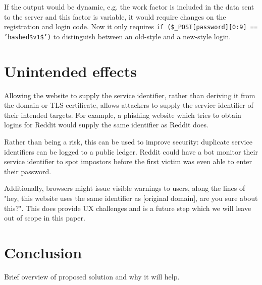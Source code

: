 \documentclass{paper}
\newcommand{\code}[1]{\texttt{\colorbox{gray!11}{#1}}}
\begin{document}
If the output would be dynamic, e.g. the work factor is included in the data sent to the
server and this factor is variable, it would require changes on the registration and login
code. Now it only requires \code{if (\$\_POST[password][0:9] == 'hashed\$v1\$')} to
distinguish between an old-style and a new-style login.

\section{Unintended effects}

Allowing the website to supply the service identifier, rather than deriving it from the
domain or TLS certificate, allows attackers to supply the service identifier of their
intended targets. For example, a phishing website which tries to obtain logins for Reddit
would supply the same identifier as Reddit does.

Rather than being a risk, this can be used to improve security: duplicate service
identifiers can be logged to a public ledger. Reddit could have a bot monitor their service
identifier to spot impostors before the first victim was even able to enter their password.

Additionally, browsers might issue visible warnings to users, along the lines of "hey, this
website uses the same identifier as [original domain], are you sure about this?". This does
provide UX challenges and is a future step which we will leave out of scope in this paper.

\section*{Conclusion}

Brief overview of proposed solution and why it will help.

\end{document}
